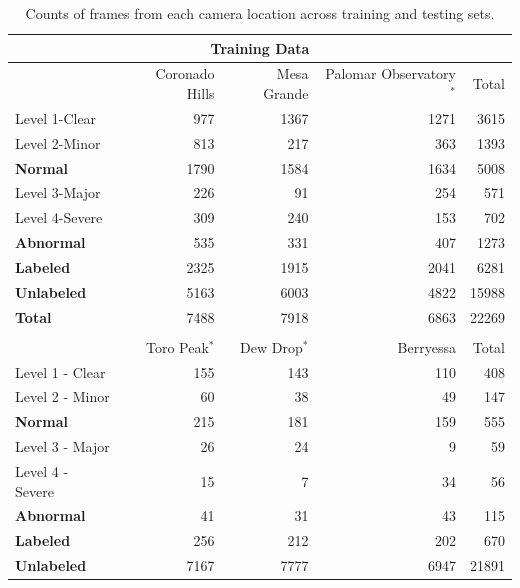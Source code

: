 \documentclass{article}
\begin{document}
\begin{table}[H]
\scriptsize
\centering
\begin{threeparttable}

\caption{Counts of frames from each camera location across training and testing sets.}
\label{tab:frame_counts}

\begin{tabular}{@{}lrrrr@{}}
\toprule
\multicolumn{5}{c}{\textbf{Training Data}} \\
\midrule
& Coronado Hills & Mesa Grande & Palomar Observatory$^{*}$ & Total \\
\midrule

Level 1-Clear  & 977  & 1367 & 1271 & 3615 \\
Level 2-Minor  & 813  & 217  & 363  & 1393 \\
\textbf{Normal}  & 1790 & 1584 & 1634 & 5008 \\

\midrule
Level 3-Major  & 226  & 91  & 254  & 571 \\
Level 4-Severe & 309  & 240 & 153  & 702 \\
\textbf{Abnormal}& 535  & 331  & 407  & 1273 \\

\midrule
\textbf{Labeled}   & 2325 & 1915 & 2041 & 6281 \\
\textbf{Unlabeled} & 5163 & 6003 & 4822 & 15988 \\

\midrule
\textbf{Total} & 7488 & 7918 & 6863 & 22269 \\
\bottomrule

\addlinespace[0.5em]

\toprule
\multicolumn{5}{c}{\textbf{Testing Data}} \\
\midrule
& Toro Peak$^{*}$ & Dew Drop$^{*}$ & Berryessa & Total \\
\midrule

Level 1 - Clear  & 155 & 143 & 110 & 408 \\
Level 2 - Minor  & 60  & 38  & 49  & 147 \\
\textbf{Normal}  & 215 & 181 & 159 & 555 \\

\midrule
Level 3 - Major  & 26 & 24 & 9 & 59 \\
Level 4 - Severe & 15 & 7 & 34 & 56 \\
\textbf{Abnormal}& 41 & 31 & 43 & 115 \\

\midrule
\textbf{Labeled}   & 256 & 212 & 202 & 670 \\
\textbf{Unlabeled} & 7167 & 7777 & 6947 & 21891 \\


\end{tabular}
\end{threeparttable}
\end{table}
\end{document}
